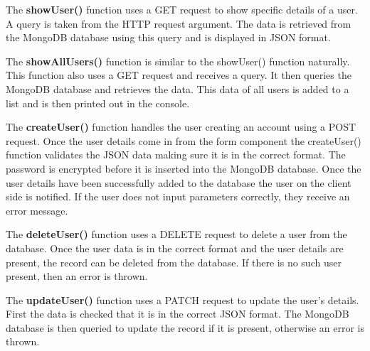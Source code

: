 The \textbf{showUser()} function uses a GET request to show specific details of a user. A query is taken from the HTTP request argument. The data is retrieved from the MongoDB database using this query and is displayed in JSON format.\newline

The \textbf{showAllUsers()} function is similar to the showUser() function  naturally. This function also uses a GET request and receives a query. It then queries the MongoDB database and retrieves the data. This data of all users is added to a list and is then printed out in the console.\newline

The \textbf{createUser()} function handles the user creating an account using a POST request. Once the user details come in from the form component the createUser() function validates the JSON data making sure it is in the correct format. The password is encrypted before it is inserted into the MongoDB database. Once the user details have been successfully added to the database the user on the client side is notified. If the user does not input parameters correctly, they receive an error message.\newline

The \textbf{deleteUser()} function uses a DELETE request to delete a user from the database. Once the user data is in the correct format and the user details are present, the record can be deleted from the database. If there is no such user present, then an error is thrown.\newline

The \textbf{updateUser()} function uses a PATCH request to update the user’s details. First the data is checked that it is in the correct JSON format. The MongoDB database is then queried to update the record if it is present, otherwise an error is thrown.\newline

